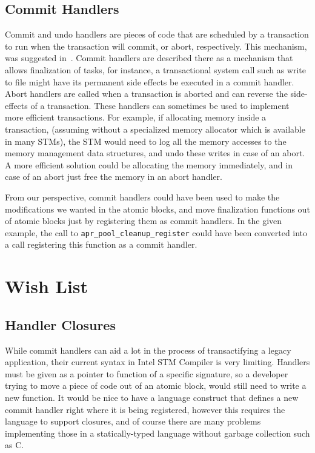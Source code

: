 \documentclass[preprint,11pt]{sigplanconf}
\let \cite = \citep
\begin{document}
\subsection{Commit Handlers}
Commit and undo handlers are pieces of code that are scheduled by a transaction
to run when the transaction will commit, or abort, respectively. This mechanism,
was suggested in~\cite{tm:commit-handlers}.  Commit handlers are described
there as a mechanism that allows finalization of tasks, for instance, a
transactional system call such as write to file might have its permanent side
effects be executed in a commit handler. 
Abort handlers are called when a transaction is aborted and can reverse the 
side-effects of a transaction. These handlers can sometimes be used to implement
more efficient transactions. For example, if allocating memory inside a
transaction, (assuming without a specialized memory allocator which is available
in many STMs), the STM would need to log all the memory accesses to the memory
management data structures, and undo these writes in case of an abort. A more
efficient solution could be allocating the memory immediately, and in case of an
abort just free the memory in an abort handler.

From our perspective, commit handlers could have been used to make the
modifications we wanted in the atomic blocks, and move finalization functions
out of atomic blocks just by registering them as commit handlers. In the given
example, the call to {\tt apr\_pool\_cleanup\_register} could have been
converted into a call registering this function as a commit handler.

\section{Wish List}\label{sec:wishlist}
\subsection{Handler Closures}
While commit handlers can aid a lot in the process of transactifying a legacy
application, their current syntax in Intel STM Compiler is very limiting.
Handlers must be given as a pointer to function of a specific signature, so a
developer trying to move a piece of code out of an atomic block, would still
need to write a new function. It would be nice to have a language construct that
defines a new commit handler right where it is being registered, however this
requires the language to support closures, and of course there are many problems
implementing those in a statically-typed language without garbage collection
such as C.
\end{document}
